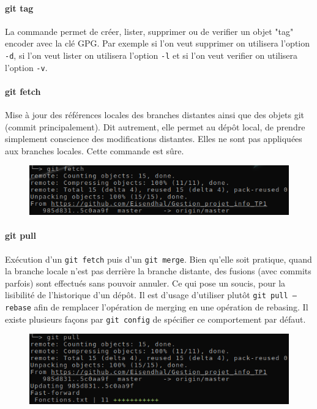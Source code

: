 \documentclass[11pt,canadien]{article}
\begin{document}
\paragraph{git tag}La commande permet de créer, lister, supprimer ou de verifier un objet "tag" encoder avec la clé GPG. Par exemple si l'on veut supprimer on utilisera  l'option \texttt{-d}, si l'on veut lister on utilisera l'option \texttt{-l} et si l'on veut verifier on utilisera l'option \texttt{-v}.

\paragraph{git fetch}Mise à jour des références locales des branches distantes ainsi que des objets git (commit principalement). Dit autrement, elle permet au dépôt local, de prendre simplement conscience des modifications distantes. Elles ne sont pas appliquées aux branches locales. Cette commande est sûre.
\begin{figure}[H]
	\centering
	\includegraphics{images/git_fetch.png}
\end{figure}

\paragraph{git pull}Exécution d'un \texttt{git fetch} puis d'un \texttt{git merge}. Bien qu'elle soit pratique, quand la branche locale n'est pas derrière la branche distante, des fusions (avec commits parfois) sont effectués sans pouvoir annuler. Ce qui pose un soucis, pour la lisibilité de l'historique d'un dépôt. Il est d'usage d'utiliser plutôt \texttt{git pull --rebase} afin de remplacer l'opération de merging en une opération de rebasing. Il existe plusieurs façons par \texttt{git config} de spécifier ce comportement par défaut.
\begin{figure}[H]
	\centering
	\includegraphics{images/git_pull.png}
\end{figure}
\end{document}
